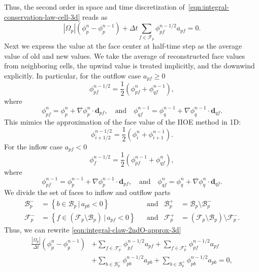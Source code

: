 \documentclass[../thesis.tex]{subfiles}
\begin{document}
Thus, the second order in space and time discretization
of~\eqref{eqn:integral-conservation-law-cell-3d} reads as
\begin{equation}\label{eqn:integral-claw-2ndO-approx-3d}
	|\Omega_p|(\phi_p^n - \phi_p^{n-1})
	+ \Delta t \sum_{f \in \mathcal{F}_p}
	\phi_{pf}^{n-1/2} a_{pf} = 0.
\end{equation}
Next we express the value at the face center at half-time step
as the average value of old and new values. We take the average
of reconstructed face values from neighboring cells,
the upwind value is treated implicitly, and the downwind explicitly.
In particular, for the outflow case \(a_{pf} \geq 0\)
\[
	\phi_{pf}^{n-1/2} = \frac{1}{2}(\phi_{pf}^n + \phi_{qf}^{n-1}),
\]
where
\[
	\phi_{pf}^{n} = \phi_p^{n} + \nabla\phi_p^{n}\cdot\mathbf{d}_{pf},
	\quad \text{and} \quad
	\phi_{qf}^{n-1} = \phi_q^{n-1} + \nabla\phi_q^{n-1}\cdot\mathbf{d}_{qf}.
\]
This mimics the approximation of the face value of the IIOE method
\cite{2014_Mikula,2019_Hahn,2020_Ibolya_CONF} in 1D:
\[
	\phi_{i+1/2}^{n-1/2} = \frac{1}{2}(\phi_i^{n} + \phi_{i+1}^{n-1}).
\]
For the inflow case \(a_{pf} < 0\)
\[
	\phi_{f}^{n-1/2} = \frac{1}{2}(\phi_{pf}^{n-1} + \phi_{qf}^{n}),
\]
where
\begin{equation}
	\phi_{pf}^{n-1} = \phi_p^{n-1} + \nabla\phi_p^{n-1}\cdot\mathbf{d}_{pf},
	\quad \text{and} \quad
	\phi_{qf}^{n} = \phi_q^{n} + \nabla\phi_q^{n}\cdot\mathbf{d}_{qf}.
\end{equation}
We divide the set of faces to inflow and outflow parts
\begin{align*}
	\mathcal{B}_p^- &= \left\{b \in \mathcal{B}_p\, |\, a_{pb} < 0\right\}
	& &\text{and} &
	\mathcal{B}_p^+ &= \mathcal{B}_p \setminus \mathcal{B}_p^- \\
	\mathcal{F}_p^- &= \left\{f \in (\mathcal{F}_p \setminus \mathcal{B}_p) \, |\, a_{pf} < 0\right\}
	& &\text{and} &
	\mathcal{F}_p^+ &= (\mathcal{F}_p \setminus \mathcal{B}_p) \setminus \mathcal{F}_p^-.
\end{align*}
Thus, we can rewrite \eqref{eqn:integral-claw-2ndO-approx-3d}
\begin{equation}\label{eqn:fvm-discretization-3d}
	\begin{split}
	\frac{|\Omega_p|}{\Delta t}(\phi_p^{n} - \phi_p^{n-1})
	&+ \sum_{f \in \mathcal{F}_p^-} \phi_{pf}^{n-1/2} a_{pf}
	+ \sum_{f \in \mathcal{F}_p^+} \phi_{pf}^{n-1/2} a_{pf}\\
	&+ \sum_{b \in \mathcal{B}_p^-} \phi_{pb}^{n-1/2} a_{pb}
	+ \sum_{b \in \mathcal{B}_p^+} \phi_{pb}^{n-1/2} a_{pb} = 0,
	\end{split}
\end{equation}
\end{document}
